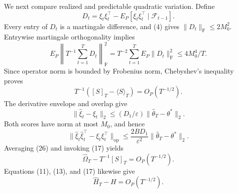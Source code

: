 We next compare realized and predictable quadratic variation. Define
\[
 D_t=\xi_t\xi_t^\top-E_P[\xi_t\xi_t^\top\mid\mathcal F_{t-1}].
 \tag{22}
\]
Every entry of \(D_t\) is a martingale difference, and (4) gives \(\|D_t\|_{\mathrm F}\le2M_0^2\). Entrywise martingale orthogonality implies
\[
 E_P\left\|T^{-1}\sum_{t=1}^T D_t\right\|_{\mathrm F}^2
 =T^{-2}\sum_{t=1}^T E_P\|D_t\|_{\mathrm F}^2
 \le4M_0^4/T.
 \tag{23}
\]
Since operator norm is bounded by Frobenius norm, Chebyshev's inequality proves
\[
 T^{-1}([S]_T-\langle S\rangle_T)=O_P(T^{-1/2}).
 \tag{24}
\]
The derivative envelope and overlap give
\[
 \|\widehat\xi_t-\xi_t\|_2
 \le(D_1/\varepsilon)\|\widehat\theta_T-\theta^*\|_2.
 \tag{25}
\]
Both scores have norm at most \(M_0\), and hence
\[
 \|\widehat\xi_t\widehat\xi_t^\top-\xi_t\xi_t^\top\|_{\mathrm{op}}
 \le\frac{2BD_1}{\varepsilon^2}\|\widehat\theta_T-\theta^*\|_2.
 \tag{26}
\]
Averaging (26) and invoking (17) yields
\[
 \widehat\Omega_T-T^{-1}[S]_T=O_P(T^{-1/2}).
 \tag{27}
\]
Equations (11), (13), and (17) likewise give
\[
 \widehat H_T-H=O_P(T^{-1/2}).
 \tag{28}
\]

